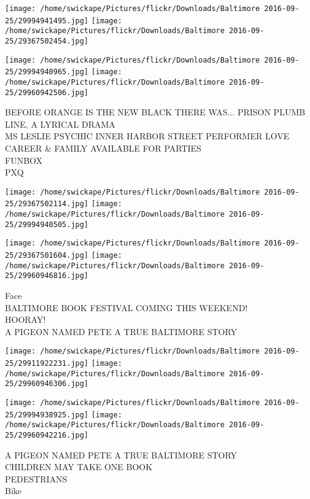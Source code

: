\documentclass[10pt,letterpaper]{article}
\begin{document}
\texttt{[image: /home/swickape/Pictures/flickr/Downloads/Baltimore 2016-09-25/29994941495.jpg]}
\texttt{[image: /home/swickape/Pictures/flickr/Downloads/Baltimore 2016-09-25/29367502454.jpg]}

\texttt{[image: /home/swickape/Pictures/flickr/Downloads/Baltimore 2016-09-25/29994940965.jpg]}
\texttt{[image: /home/swickape/Pictures/flickr/Downloads/Baltimore 2016-09-25/29960942506.jpg]}

BEFORE ORANGE IS THE NEW BLACK THERE WAS... PRISON PLUMB LINE, A LYRICAL DRAMA\\
MS LESLIE PSYCHIC INNER HARBOR STREET PERFORMER LOVE CAREER \& FAMILY AVAILABLE FOR PARTIES\\
FUNBOX\\
PXQ\\
\pagebreak

\texttt{[image: /home/swickape/Pictures/flickr/Downloads/Baltimore 2016-09-25/29367502114.jpg]}
\texttt{[image: /home/swickape/Pictures/flickr/Downloads/Baltimore 2016-09-25/29994940505.jpg]}

\texttt{[image: /home/swickape/Pictures/flickr/Downloads/Baltimore 2016-09-25/29367501604.jpg]}
\texttt{[image: /home/swickape/Pictures/flickr/Downloads/Baltimore 2016-09-25/29960946816.jpg]}

Face\\
BALTIMORE BOOK FESTIVAL COMING THIS WEEKEND!\\
HOORAY!\\
A PIGEON NAMED PETE A TRUE BALTIMORE STORY\\
\pagebreak

\texttt{[image: /home/swickape/Pictures/flickr/Downloads/Baltimore 2016-09-25/29911922231.jpg]}
\texttt{[image: /home/swickape/Pictures/flickr/Downloads/Baltimore 2016-09-25/29960946306.jpg]}

\texttt{[image: /home/swickape/Pictures/flickr/Downloads/Baltimore 2016-09-25/29994938925.jpg]}
\texttt{[image: /home/swickape/Pictures/flickr/Downloads/Baltimore 2016-09-25/29960942216.jpg]}

A PIGEON NAMED PETE A TRUE BALTIMORE STORY\\
CHILDREN MAY TAKE ONE BOOK\\
PEDESTRIANS\\
Bike\\
\pagebreak
\end{document}
